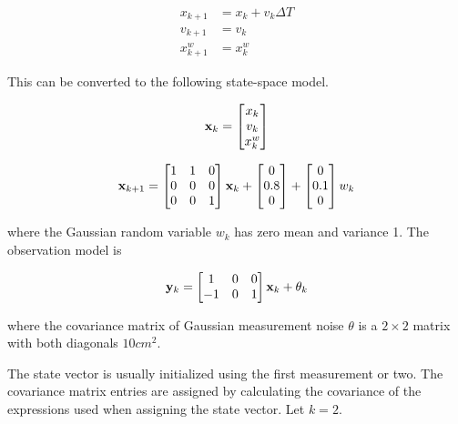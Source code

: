 \begin{align}
  x_{k+1} &= x_k + v_k \Delta T \\
  v_{k+1} &= v_k \\
  x_{k+1}^w &= x_k^w
\end{align}

This can be converted to the following state-space \gls{model}.

\begin{equation}
  \mathbf{x}_k =
  \begin{bmatrix}
    x_k \\
    v_k \\
    x_k^w
  \end{bmatrix}
\end{equation}

\begin{equation}
  \mathbf{x}_{k+1} =
  \begin{bmatrix}
    1 & 1 & 0 \\
    0 & 0 & 0 \\
    0 & 0 & 1
  \end{bmatrix} \mathbf{x}_k +
  \begin{bmatrix}
    0 \\
    0.8 \\
    0
  \end{bmatrix} +
  \begin{bmatrix}
    0 \\
    0.1 \\
    0
  \end{bmatrix} w_k
\end{equation}

where the Gaussian random variable $w_k$ has zero mean and variance 1. The
observation \gls{model} is

\begin{equation}
  \mathbf{y}_k =
  \begin{bmatrix}
    1 & 0 & 0 \\
    -1 & 0 & 1
  \end{bmatrix} \mathbf{x}_k + \theta_k
\end{equation}

where the covariance matrix of Gaussian measurement noise $\theta$ is a
$2 \times 2$ matrix with both diagonals $10 cm^2$.

The state vector is usually initialized using the first measurement or two. The
covariance matrix entries are assigned by calculating the covariance of the
expressions used when assigning the state vector. Let $k = 2$.

